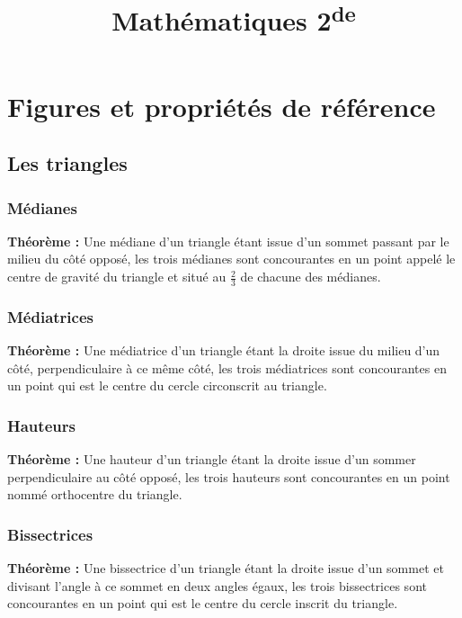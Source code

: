\documentclass[a4paper,titlepage]{article}
\title{Mathématiques 2\textsuperscript{de}}
\author{}
\date{}
\let\oldsection\section
\renewcommand\section{\clearpage\oldsection}
\begin{document}
\setlength{\abovedisplayskip}{0cm}
\setlength{\belowdisplayskip}{0cm}
\setlength{\abovedisplayshortskip}{0cm}
\setlength{\belowdisplayshortskip}{0cm}
\setlength{\jot}{0cm}
\maketitle
\null\newpage
\null\newpage
\tableofcontents
\null\newpage
\null\newpage
\null\newpage
{}
\section{Figures et propriétés de référence}
    \subsection{Les triangles}
        \subsubsection{Médianes}
            \textbf{Théorème :} Une médiane d’un triangle étant issue d’un sommet passant par le milieu du côté opposé, les trois médianes sont concourantes en un point appelé le centre de gravité du triangle et situé au $\frac{2}{3}$ de chacune des médianes.
        \subsubsection{Médiatrices}
            \textbf{Théorème :} Une médiatrice d’un triangle étant la droite issue du milieu d’un côté, perpendiculaire à ce même côté, les trois médiatrices sont concourantes en un point qui est le centre du cercle circonscrit au triangle.
        \subsubsection{Hauteurs}
            \textbf{Théorème :} Une hauteur d’un triangle étant la droite issue d’un sommer perpendiculaire au côté opposé, les trois hauteurs sont concourantes en un point nommé orthocentre du triangle.
        \subsubsection{Bissectrices}
            \textbf{Théorème :} Une bissectrice d’un triangle étant la droite issue d’un sommet et divisant l’angle à ce sommet en deux angles égaux, les trois bissectrices sont concourantes en un point qui est le centre du cercle inscrit du triangle.
\end{document}
